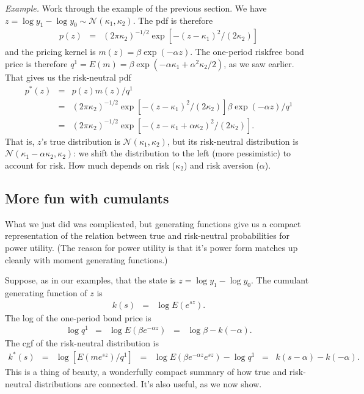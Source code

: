 \documentclass[11pt]{article}
\begin{document}
{\it Example.\/}
Work through the example of the previous section.
We have $ z = \log y_1 - \log y_0 \sim \mathcal{N}(\kappa_1, \kappa_2) $.
The pdf is therefore
\begin{eqnarray*}
    p(z) &=& (2 \pi \kappa_2)^{-1/2} \exp[ - (z-\kappa_1)^2/(2\kappa_2)]
\end{eqnarray*}
and the pricing kernel is $m(z) = \beta \exp(-\alpha z)$.
The one-period riskfree bond price is therefore
$ q^1 = E(m) = \beta \exp(-\alpha \kappa_1 + \alpha^2 \kappa_2/2)$,
as we saw earlier.
That gives us the risk-neutral pdf
\begin{eqnarray*}
    p^*(z)  &=& p(z) m (z) /q^1 \\
            &=& (2 \pi \kappa_2)^{-1/2} \exp[ - (z-\kappa_1)^2/(2\kappa_2)]
                        \beta \exp(-\alpha z)/q^1 \\
            &=& (2 \pi \kappa_2)^{-1/2} \exp[ - (z-\kappa_1+\alpha \kappa_2)^2/(2\kappa_2)] .
\end{eqnarray*}
That is, $z$'s true distribution is $\mathcal{N}(\kappa_1,\kappa_2)$,
but its risk-neutral distribution is $\mathcal{N}(\kappa_1-\alpha \kappa_2,\kappa_2)$:
we shift the distribution to the left (more pessimistic) to account
for risk.  How much depends on risk ($\kappa_2$) and risk aversion ($\alpha$).


\subsection*{More fun with cumulants}

What we just did was complicated, but generating functions give us
a compact representation of the relation between true and risk-neutral
probabilities for power utility.
(The reason for power utility is that it's power form matches up cleanly
with moment generating functions.)

Suppose, as in our examples,
that the state is $ z = \log y_1 - \log y_0$.
The cumulant generating function  of $z$ is
\begin{eqnarray*}
    k(s) &=& \log E (e^{sz}) .
\end{eqnarray*}
The log of the one-period bond price is
\begin{eqnarray*}
    \log q^1  &=& \log E (\beta e^{-\alpha z})
            \;\;=\;\; \log \beta - k(-\alpha).
\end{eqnarray*}
The cgf of the risk-neutral distribution is
\begin{eqnarray*}
    k^*(s) &=& \log [E (m e^{sz})/q^1]
        \;\;=\;\;   \log E \left( \beta e^{-\alpha z}e^{sz} \right) - \log q^1
        \;\;=\;\;  k(s-\alpha) - k(-\alpha)  .
\end{eqnarray*}
This is a thing of beauty, a wonderfully compact
summary of how true and risk-neutral distributions are connected.
It's also useful, as we now show.
\end{document}
